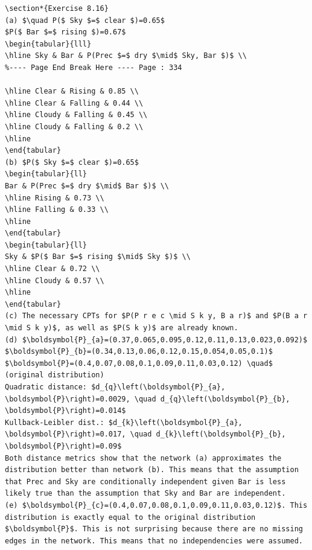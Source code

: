 \documentclass[10pt]{article}
\begin{document}
\begin{verbatim}
\section*{Exercise 8.16}
(a) $\quad P($ Sky $=$ clear $)=0.65$
$P($ Bar $=$ rising $)=0.67$
\begin{tabular}{lll}
\hline Sky & Bar & P(Prec $=$ dry $\mid$ Sky, Bar $)$ \\
%---- Page End Break Here ---- Page : 334

\hline Clear & Rising & 0.85 \\
\hline Clear & Falling & 0.44 \\
\hline Cloudy & Falling & 0.45 \\
\hline Cloudy & Falling & 0.2 \\
\hline
\end{tabular}
(b) $P($ Sky $=$ clear $)=0.65$
\begin{tabular}{ll} 
Bar & P(Prec $=$ dry $\mid$ Bar $)$ \\
\hline Rising & 0.73 \\
\hline Falling & 0.33 \\
\hline
\end{tabular}
\begin{tabular}{ll} 
Sky & $P($ Bar $=$ rising $\mid$ Sky $)$ \\
\hline Clear & 0.72 \\
\hline Cloudy & 0.57 \\
\hline
\end{tabular}
(c) The necessary CPTs for $P(P r e c \mid S k y, B a r)$ and $P(B a r \mid S k y)$, as well as $P(S k y)$ are already known.
(d) $\boldsymbol{P}_{a}=(0.37,0.065,0.095,0.12,0.11,0.13,0.023,0.092)$
$\boldsymbol{P}_{b}=(0.34,0.13,0.06,0.12,0.15,0.054,0.05,0.1)$
$\boldsymbol{P}=(0.4,0.07,0.08,0.1,0.09,0.11,0.03,0.12) \quad$ (original distribution)
Quadratic distance: $d_{q}\left(\boldsymbol{P}_{a}, \boldsymbol{P}\right)=0.0029, \quad d_{q}\left(\boldsymbol{P}_{b}, \boldsymbol{P}\right)=0.014$
Kullback-Leibler dist.: $d_{k}\left(\boldsymbol{P}_{a}, \boldsymbol{P}\right)=0.017, \quad d_{k}\left(\boldsymbol{P}_{b}, \boldsymbol{P}\right)=0.09$
Both distance metrics show that the network (a) approximates the distribution better than network (b). This means that the assumption that Prec and Sky are conditionally independent given Bar is less likely true than the assumption that Sky and Bar are independent.
(e) $\boldsymbol{P}_{c}=(0.4,0.07,0.08,0.1,0.09,0.11,0.03,0.12)$. This distribution is exactly equal to the original distribution $\boldsymbol{P}$. This is not surprising because there are no missing edges in the network. This means that no independencies were assumed.


\end{verbatim}
\end{document}
